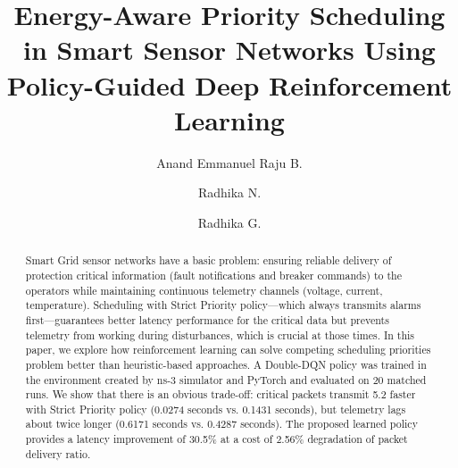 \documentclass[runningheads]{llncs}
\begin{document}
\title{Energy-Aware Priority Scheduling in Smart Sensor Networks Using Policy-Guided Deep Reinforcement Learning}

\author{Anand Emmanuel Raju B. \and Radhika N. \and Radhika G.}


\maketitle

\begin{abstract}
Smart Grid sensor networks have a basic problem: ensuring reliable delivery of protection critical information (fault notifications and breaker commands) to the operators while maintaining continuous telemetry channels (voltage, current, temperature). Scheduling with Strict Priority policy---which always transmits alarms first---guarantees better latency performance for the critical data but prevents telemetry from working during disturbances, which is crucial at those times. In this paper, we explore how reinforcement learning can solve competing scheduling priorities problem better than heuristic-based approaches. A Double-DQN policy was trained in the environment created by ns-3 simulator and PyTorch and evaluated on 20 matched runs. We show that there is an obvious trade-off: critical packets transmit 5.2 faster with Strict Priority policy (0.0274 seconds vs. 0.1431 seconds), but telemetry lags about twice longer (0.6171 seconds vs. 0.4287 seconds). The proposed learned policy provides a latency improvement of 30.5\% at a cost of 2.56\% degradation of packet delivery ratio.

\end{abstract}
\end{document}
